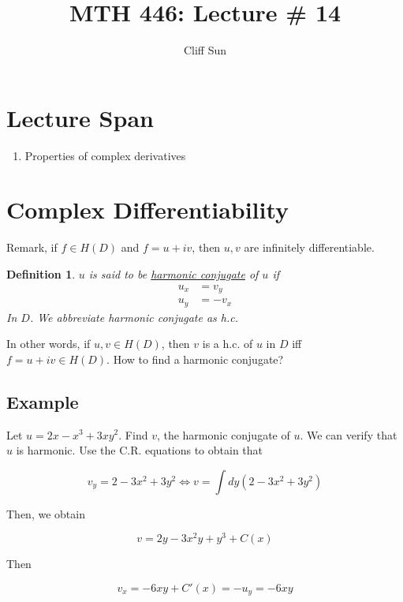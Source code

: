 \documentclass{article}
\title{MTH 446: Lecture \# 14}
\author{Cliff Sun}
\newtheorem{definition}[theorem]{Definition}
\newtheorem{one minute paper}[theorem]{One Minute Paper}
\begin{document}
\maketitle

\section*{Lecture Span}
\begin{enumerate}
    \item Properties of complex derivatives
\end{enumerate}

\section*{Complex Differentiability}

Remark, if $f \in H(D)$ and $f = u + iv$, then $u,v$ are infinitely differentiable. 

\begin{definition}
    $u$ is said to be \underline{harmonic conjugate} of $u$ if 
    \begin{align}
        u_x &= v_y \\
        u_y &= -v_x
    \end{align}
    In $D$. We abbreviate harmonic conjugate as h.c. 
\end{definition}

In other words, if $u,v \in H(D)$, then $v$ is a h.c. of $u$ in $D$ iff $f = u + iv \in H(D)$. How to find a harmonic conjugate? 

\subsection*{Example}

Let $u = 2x - x^3 + 3xy^2$. Find $v$, the harmonic conjugate of $u$. We can verify that $u$ is harmonic. Use the C.R. equations to obtain that 

\begin{equation}
    v_y = 2 - 3x^2 +  3y^2 \iff v = \int dy (2 - 3x^2 + 3y^2)
\end{equation}

Then, we obtain 

\begin{equation}
    v = 2y - 3x^2y + y^3 + C(x)
\end{equation}

Then 

\begin{equation}
    v_x = -6xy + C'(x) = -u_y = -6xy
\end{equation}
\end{document}

